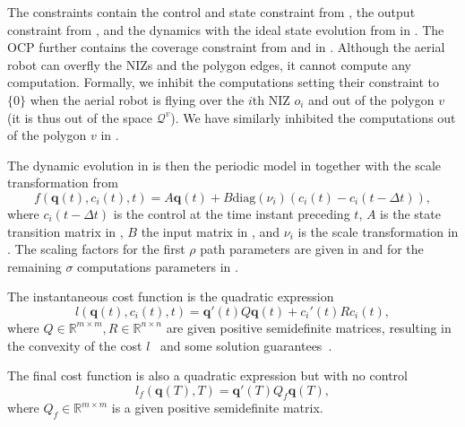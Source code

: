 The constraints contain the control and state constraint from , the output constraint from , and the dynamics with the ideal state evolution from  in . The OCP further contains the coverage constraint from  and  in . Although the aerial robot can overfly the NIZs and the polygon edges, it cannot compute any computation. Formally, we inhibit the computations setting their constraint to $\{0\}$ when the aerial robot is flying over the $i$th NIZ $o_i$ and out of the polygon $v$ (it is thus out of the space $\mathcal{Q}^v$). We have similarly inhibited the computations out of the polygon $v$ in .

The dynamic evolution in  is then the periodic model in  together with the scale transformation from 
\begin{equation}\label{eq:perf-model-in-mpc}
  f(\mathbf{q}(t),c_i(t),t)=A\mathbf{q}(t)+B\mathrm{diag}(\nu_i)(c_i(t)-c_i(t-\Delta t)),
\end{equation}
where $c_i(t-\Delta t)$ is the control at the time instant preceding $t$, $A$ is the state transition matrix in , $B$ the input matrix in , and $\nu_i$ is the scale transformation in . The scaling factors for the first $\rho$ path parameters are given in  and for the remaining $\sigma$ computations parameters in .

The instantaneous cost function is the quadratic expression
\begin{equation}\label{eq:insta-cost-mpc}
  l(\mathbf{q}(t),c_i(t),t)=\mathbf{q}'(t)Q\mathbf{q}(t)+c_i'(t)Rc_i(t),
\end{equation}
where $Q\in\mathbb{R}^{m\times m},R\in\mathbb{R}^{n\times n}$ are given positive semidefinite matrices, resulting in the convexity of the cost $l$~\citep{nocedal2006numerical} and some solution guarantees~\citep{beck2014introduction}.

The final cost function is also a quadratic expression but with no control~\citep{rawlings2017model}
\begin{equation}\label{eq:final-cost-mpc}
  l_f(\mathbf{q}(T),T)=\mathbf{q}'(T)Q_f\mathbf{q}(T),
\end{equation}
where $Q_f\in\mathbb{R}^{m\times m}$ is a given positive semidefinite matrix.

